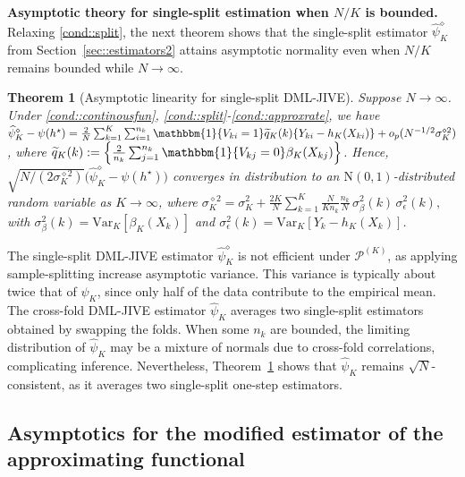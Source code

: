 \documentclass[11pt]{article}
\theoremstyle{plain}
\newtheorem{theorem}{Theorem}
\theoremstyle{definition}
\theoremstyle{remark}
\theoremstyle{definition}
\begin{document}
 \medskip

\noindent\textbf{Asymptotic theory for single-split estimation when \(N/K\) is bounded.}
Relaxing \ref{cond::split}, the next theorem shows that the single-split estimator \(\widehat{\psi}_K^{\diamond}\) from Section~\ref{sec::estimators2} attains asymptotic normality even when \(N/K\) remains bounded while $N \rightarrow \infty$.



 \begin{theorem}[Asymptotic linearity for single-split DML-JIVE]
 Suppose $N \rightarrow \infty$. Under \ref{cond::continousfun}, \ref{cond::split}-\ref{cond::approxrate}, we have  \(\widehat{\psi}_K^{\diamond} - \psi(h^\star) = \frac{2}{N} \sum_{k=1}^K  \sum_{i=1}^{n_k} \mathbbm{1}\{V_{ki} = 1\} \widetilde{q}_K(k)\{Y_{ki} - h_K(X_{ki})\} + o_p(N^{-1/2} \sigma_K^{\diamond 2})\), where $\widetilde{q}_K(k) := \left\{\frac{2}{n_k}\sum_{j=1}^{n_k}\mathbbm{1}\{V_{kj} = 0\}  \beta_K(X_{kj})\right\}$. Hence, \(\sqrt{N/(2\sigma_K^{\diamond 2})} \big( \widehat{\psi}_K^{\diamond} - \psi(h^\star) \big)\) converges in distribution to an \(\text{N}(0,1)\)-distributed random variable as \(K \to \infty\), where \(
\sigma_K^{\diamond 2} = \sigma_K^2  +    \frac{2K}{N} \sum_{k=1}^K \frac{N}{Kn_k} \frac{n_k}{N} \,\sigma_{\beta}^{2}(k) \,\sigma_{\epsilon}^{2}(k),
\)
with \(\sigma_{\beta}^{2}(k) = \mathrm{Var}_{K}[\beta_{K}(X_k)]\) and \(\sigma_{\epsilon}^{2}(k) = \mathrm{Var}_{K}[Y_k - h_K(X_k)]\).
\label{theorem::asymbounded}
\end{theorem}

The single-split DML-JIVE estimator \(\widehat{\psi}_{K}^{\diamond}\) is not efficient under \(\mathcal{P}^{(K)}\), as applying sample-splitting increase asymptotic variance. This variance is typically about twice that of \(\widehat{\psi}_K\), since only half of the data contribute to the empirical mean. 
The cross-fold DML-JIVE estimator \(\widehat{\psi}_K\) averages two single-split estimators obtained by swapping the folds. When some $n_k$ are bounded, the limiting distribution of $\widehat{\psi}_K$ may be a mixture of normals due to cross-fold correlations, complicating inference. Nevertheless, Theorem~\ref{theorem::asymbounded} shows that $\widehat{\psi}_K$ remains $\sqrt{N}$-consistent, as it averages two single-split one-step estimators.


\subsection{Asymptotics for the modified estimator of the approximating functional}
\label{sec::theory3}
\end{document}
